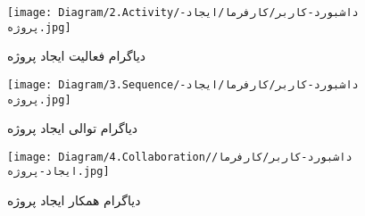 \begin{figure}[H]
	\centering
	\texttt{[image: Diagram/2.Activity/داشبورد-کاربر/کارفرما/ایجاد-پروژه.jpg]}
	\caption{دیاگرام فعالیت ایجاد پروژه}
	\label{fig:a:ایجاد-پروژه}
\end{figure}
\begin{figure}[H]
	\centering
	\texttt{[image: Diagram/3.Sequence/داشبورد-کاربر/کارفرما/ایجاد-پروژه.jpg]}
	\caption{دیاگرام توالی ایجاد پروژه}
	\label{fig:s:ایجاد-پروژه}
\end{figure}
\begin{figure}[H]
\centering
\texttt{[image: Diagram/4.Collaboration/داشبورد-کاربر/کارفرما/ایجاد-پروژه.jpg]}
\caption{دیاگرام همکار ایجاد پروژه}
\label{fig:c:ایجاد-پروژه}
\end{figure}
